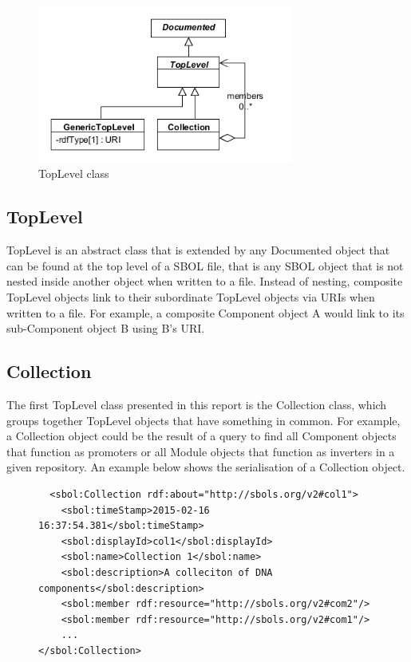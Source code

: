 \documentclass[draftspec]{sbmlpkgspec}
\newcommand{\lstsetsbol}{
 \lstset{language=sbol,
        tabsize=2
 }
}
\begin{document}
\begin{figure}[ht]
\begin{center}
\includegraphics[width=0.75\textwidth]{uml/toplevel_collection}
\caption[]{TopLevel class}
\label{uml:toplevel_collection}
\end{center}
\end{figure}


\subsection {TopLevel}
TopLevel is an abstract class that is extended by any Documented object that can be found at the top level of a SBOL file, that is any SBOL object that is not nested inside another object when written to a file. Instead of nesting, composite TopLevel objects link to their subordinate TopLevel objects via URIs when written to a file. For example, a composite Component object A would link to its sub-Component object B using B’s URI.


\subsection {Collection}
The first TopLevel class presented in this report is the Collection class, which groups together TopLevel objects that have something in common. For example, a Collection object could be the result of a query to find all Component objects that function as promoters or all Module objects that function as inverters in a given repository. An example below shows the serialisation of a Collection object. 

\begin{figure} [ht]
\lstsetsbol
\begin{lstlisting}
  <sbol:Collection rdf:about="http://sbols.org/v2#col1">
    <sbol:timeStamp>2015-02-16 16:37:54.381</sbol:timeStamp>
    <sbol:displayId>col1</sbol:displayId>
    <sbol:name>Collection 1</sbol:name>
    <sbol:description>A colleciton of DNA components</sbol:description>
    <sbol:member rdf:resource="http://sbols.org/v2#com2"/>
    <sbol:member rdf:resource="http://sbols.org/v2#com1"/>
    ...
</sbol:Collection>
\end{lstlisting}
\label{ser:Collection}
\end{figure}
\end{document}
